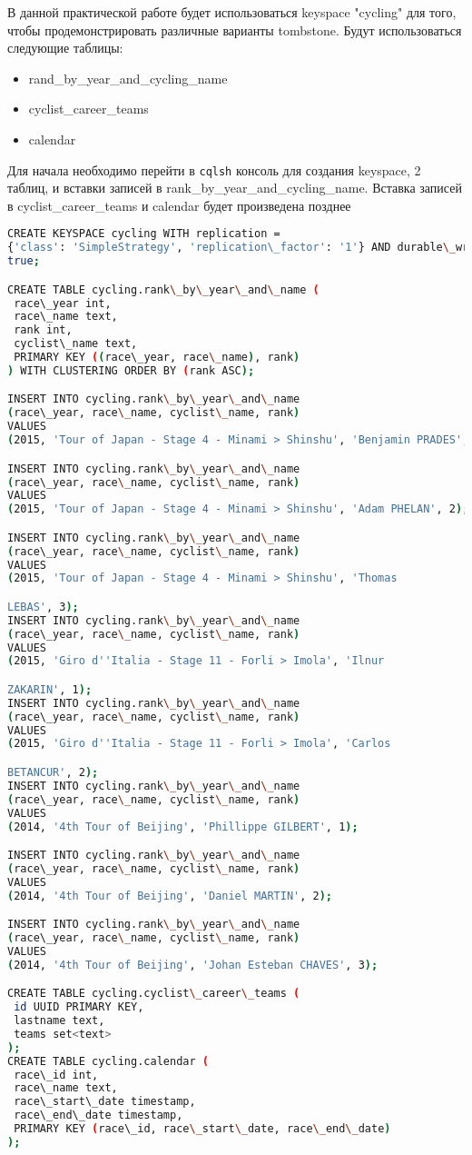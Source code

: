 В данной практической работе будет использоваться keyspace "cycling"
для того, чтобы продемонстрировать различные варианты tombstone. Будут
использоваться следующие таблицы:

\begin{itemize}
	\item rand\_by\_year\_and\_cycling\_name
	\item cyclist\_career\_teams
	\item calendar
\end{itemize}

Для начала необходимо перейти в \texttt{cqlsh} консоль для создания keyspace,
2 таблиц, и вставки записей в rank\_by\_year\_and\_cycling\_name. Вставка
записей в cyclist\_career\_teams и calendar будет произведена
позднее

\begin{lstlisting}[language=bash]
CREATE KEYSPACE cycling WITH replication =
{'class': 'SimpleStrategy', 'replication\_factor': '1'} AND durable\_writes =
true;

CREATE TABLE cycling.rank\_by\_year\_and\_name (
 race\_year int,
 race\_name text,
 rank int,
 cyclist\_name text,
 PRIMARY KEY ((race\_year, race\_name), rank)
) WITH CLUSTERING ORDER BY (rank ASC);

INSERT INTO cycling.rank\_by\_year\_and\_name
(race\_year, race\_name, cyclist\_name, rank)
VALUES
(2015, 'Tour of Japan - Stage 4 - Minami > Shinshu', 'Benjamin PRADES', 1);

INSERT INTO cycling.rank\_by\_year\_and\_name
(race\_year, race\_name, cyclist\_name, rank)
VALUES
(2015, 'Tour of Japan - Stage 4 - Minami > Shinshu', 'Adam PHELAN', 2);

INSERT INTO cycling.rank\_by\_year\_and\_name
(race\_year, race\_name, cyclist\_name, rank)
VALUES
(2015, 'Tour of Japan - Stage 4 - Minami > Shinshu', 'Thomas

LEBAS', 3);
INSERT INTO cycling.rank\_by\_year\_and\_name
(race\_year, race\_name, cyclist\_name, rank)
VALUES
(2015, 'Giro d''Italia - Stage 11 - Forli > Imola', 'Ilnur

ZAKARIN', 1);
INSERT INTO cycling.rank\_by\_year\_and\_name
(race\_year, race\_name, cyclist\_name, rank)
VALUES
(2015, 'Giro d''Italia - Stage 11 - Forli > Imola', 'Carlos

BETANCUR', 2);
INSERT INTO cycling.rank\_by\_year\_and\_name
(race\_year, race\_name, cyclist\_name, rank)
VALUES
(2014, '4th Tour of Beijing', 'Phillippe GILBERT', 1);

INSERT INTO cycling.rank\_by\_year\_and\_name
(race\_year, race\_name, cyclist\_name, rank)
VALUES
(2014, '4th Tour of Beijing', 'Daniel MARTIN', 2);

INSERT INTO cycling.rank\_by\_year\_and\_name
(race\_year, race\_name, cyclist\_name, rank)
VALUES
(2014, '4th Tour of Beijing', 'Johan Esteban CHAVES', 3);

CREATE TABLE cycling.cyclist\_career\_teams (
 id UUID PRIMARY KEY,
 lastname text,
 teams set<text>
);
CREATE TABLE cycling.calendar (
 race\_id int,
 race\_name text,
 race\_start\_date timestamp,
 race\_end\_date timestamp,
 PRIMARY KEY (race\_id, race\_start\_date, race\_end\_date)
);
\end{lstlisting}

